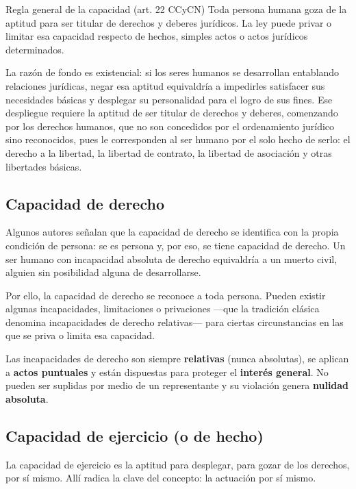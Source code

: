 \documentclass[12pt,oneside]{book}
\begin{document}
\begin{definition}{Regla general de la capacidad (art. 22 CCyCN)}
Toda persona humana goza de la aptitud para ser titular de derechos y deberes jurídicos. La ley puede privar o limitar esa capacidad respecto de hechos, simples actos o actos jurídicos determinados.
\end{definition}

La razón de fondo es existencial: si los seres humanos se desarrollan entablando relaciones jurídicas, negar esa aptitud equivaldría a impedirles satisfacer sus necesidades básicas y desplegar su personalidad para el logro de sus fines. Ese despliegue requiere la aptitud de ser titular de derechos y deberes, comenzando por los derechos humanos, que no son concedidos por el ordenamiento jurídico sino reconocidos, pues le corresponden al ser humano por el solo hecho de serlo: el derecho a la libertad, la libertad de contrato, la libertad de asociación y otras libertades básicas.

\subsection{Capacidad de derecho}

Algunos autores señalan que la capacidad de derecho se identifica con la propia condición de persona: se es persona y, por eso, se tiene capacidad de derecho. Un ser humano con incapacidad absoluta de derecho equivaldría a un muerto civil, alguien sin posibilidad alguna de desarrollarse.

Por ello, la capacidad de derecho se reconoce a toda persona. Pueden existir algunas incapacidades, limitaciones o privaciones —que la tradición clásica denomina incapacidades de derecho relativas— para ciertas circunstancias en las que se priva o limita esa capacidad.

\begin{important}
Las incapacidades de derecho son siempre \textbf{relativas} (nunca absolutas), se aplican a \textbf{actos puntuales} y están dispuestas para proteger el \textbf{interés general}. No pueden ser suplidas por medio de un representante y su violación genera \textbf{nulidad absoluta}.
\end{important}

\subsection{Capacidad de ejercicio (o de hecho)}

La capacidad de ejercicio es la aptitud para desplegar, para gozar de los derechos, por sí mismo. Allí radica la clave del concepto: la actuación por sí mismo.
\end{document}
